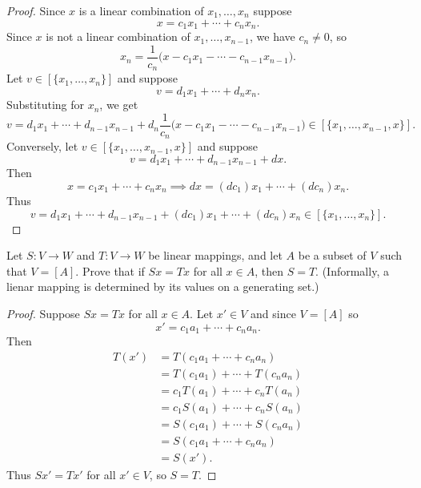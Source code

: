 \begin{proof}
    Since $x$ is a linear combination of $x_1, \ldots, x_n$ suppose 
    \[
    x = c_1 x_1 +\cdots + c_n x_n.
    \]
    Since $x$ is not a linear combination of $x_1, \ldots, x_{n-1}$, we have $c_n \neq 0$, so
    \[
    x_n = \frac{1}{c_n}\big(x - c_1 x_1 - \cdots - c_{n-1} x_{n-1}\big).
    \]
    Let $v \in [\{x_1, \ldots, x_n\}]$ and suppose 
    \[
    v = d_1 x_1 + \cdots + d_n x_n.
    \]
    Substituting for $x_n$, we get
    \[
    v = d_1 x_1 + \cdots + d_{n-1} x_{n-1} + d_n \frac{1}{c_n}\big(x - c_1 x_1 - \cdots - c_{n-1} x_{n-1}\big)
    \in [\{x_1, \ldots, x_{n-1}, x\}].
    \]
    Conversely, let $v \in  [\{x_1, \ldots, x_{n-1}, x\}]$ and suppose 
    \[
    v = d_1 x_1 + \cdots + d_{n - 1} x_{n - 1} + d x.
    \]
    Then 
    \[
    x = c_1 x_1 +\cdots + c_n x_n \implies dx = (d c_1) x_1 + \cdots + (d c_n) x_n.
    \]
    Thus 
    \[
    v = d_1 x_1 + \cdots + d_{n - 1} x_{n - 1} + (d c_1) x_1 + \cdots + (d c_n) x_n \in [\{x_1, \ldots, x_n\}].
    \]
\end{proof}

\begin{tcolorbox}[title=Problem 4, breakable]
    Let $S : V \longrightarrow W$ and $T : V \longrightarrow W$
    be linear mappings, and let $A$ be a subset of $V$ such that $V = [A]$.
    Prove that if $Sx = Tx$ for all $x \in A$, then $S = T$. (Informally,
    a lienar mapping is determined by its values on a generating set.)
\end{tcolorbox}

\begin{proof}
    Suppose $Sx = Tx$ for all $x \in A$.
    Let $x' \in V$ and since $V = [A]$ so 
    \[
    x' = c_1 a_1 + \cdots + c_n a_n.
    \]
    Then 
    \begin{align*}
        T(x') &= T(c_1 a_1 + \cdots + c_n a_n) \\
        &= T(c_1 a_1) + \cdots + T(c_n a_n) \\
        &= c_1 T(a_1) + \cdots + c_n T(a_n) \\
        &= c_1 S(a_1) + \cdots + c_n S(a_n) \\
        &= S(c_1 a_1) + \cdots + S(c_n a_n) \\
        &= S(c_1 a_1 + \cdots + c_n a_n) \\
        &= S(x').
    \end{align*}
    Thus $Sx' = Tx'$ for all $x' \in V$, so $S = T$.
\end{proof}

